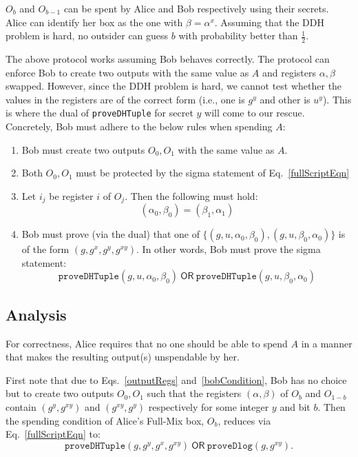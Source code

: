 \documentclass[runningheads]{llncs}
\newcommand{\ornode}{\ensuremath{\mathsf{OR}}}
\begin{document}
$O_b$ and $O_{b-1}$ can be spent by Alice and Bob respectively using their secrets. Alice can identify her box as the one with ${\beta} = {\alpha}^x$. 
Assuming that the DDH problem is hard, no outsider can guess $b$ with probability better than $\frac{1}{2}$. 

The above protocol works assuming Bob behaves correctly. The protocol can enforce Bob to create two outputs with the same value as $A$ and registers $\alpha, \beta$ swapped.
However, since the DDH problem is hard, we cannot test whether the values in the registers are of the correct form (i.e., one is $g^y$ and other is $u^y$).
This is where the dual of \texttt{proveDHTuple} for secret $y$ will come to our rescue. 
Concretely, Bob must adhere to the below rules when spending $A$:
	\begin{enumerate}
		\item Bob must create two outputs $O_0, O_1$ with the same value as $A$. 
		\item Both $O_0, O_1$ must be protected by the sigma statement of Eq.~\ref{fullScriptEqn}
        \item Let $i_j$ be register $i$ of $O_j$. Then the following must hold: 
            \begin{equation}\label{outputRegs}
    		({\alpha}_0, {\beta}_0) = ( {\beta}_1, {\alpha}_1)
            \end{equation}
		\item Bob must prove (via the dual) that one of $\{(g, u, {\alpha}_0, {\beta}_0), (g, u, {\beta}_0, {\alpha}_0)\}$ is of the form $(g, g^x, g^y, g^{xy})$. In other words, Bob must prove the sigma statement: 
    		\begin{equation}\label{bobCondition}
    		\texttt{proveDHTuple}(g, u, {\alpha}_0, {\beta}_0)~\ornode~\texttt{proveDHTuple}(g, u, {\beta}_0, {\alpha}_0)
    		\end{equation}
		
	\end{enumerate}
\subsection{Analysis}

For correctness, Alice requires that no one should be able to spend $A$ in a manner that makes the resulting output(s) unspendable by her.

First note that due to Eqs.~\ref{outputRegs} and~\ref{bobCondition}, Bob has no choice but to create two outputs $O_0, O_1$ such that the registers $({\alpha}, {\beta})$ of $O_b$ and $O_{1-b}$ contain $(g^y, g^{xy})$ and $(g^{xy}, g^y)$ respectively for some integer $y$ and bit $b$. Then the spending condition of Alice's Full-Mix box, $O_b$, reduces via Eq.~\ref{fullScriptEqn} to:
$$\texttt{proveDHTuple}(g, g^{y}, g^x, g^{xy}) ~\ornode~ \texttt{proveDlog}(g, g^{xy}).$$ 
\end{document}
